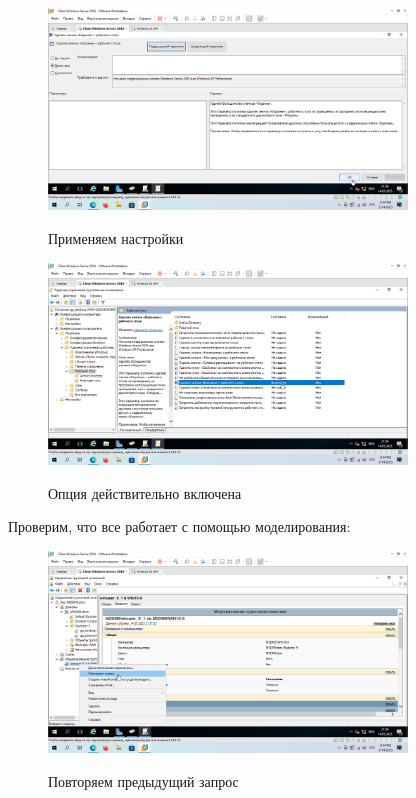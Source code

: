 \documentclass[a4paper]{article}
\begin{document}
  \begin{figure}[H]
    \centering
    \includegraphics[width=0.85\textwidth]{5_0142}
    \label{img:142}
    \caption{Применяем настройки}
  \end{figure}

  \begin{figure}[H]
    \centering
    \includegraphics[width=0.85\textwidth]{5_0143}
    \label{img:143}
    \caption{Опция действительно включена}
  \end{figure}

  Проверим, что все работает с помощью моделирования:

  \begin{figure}[H]
    \centering
    \includegraphics[width=0.85\textwidth]{5_0144}
    \label{img:144}
    \caption{Повторяем предыдущий запрос}
  \end{figure}
\end{document}

